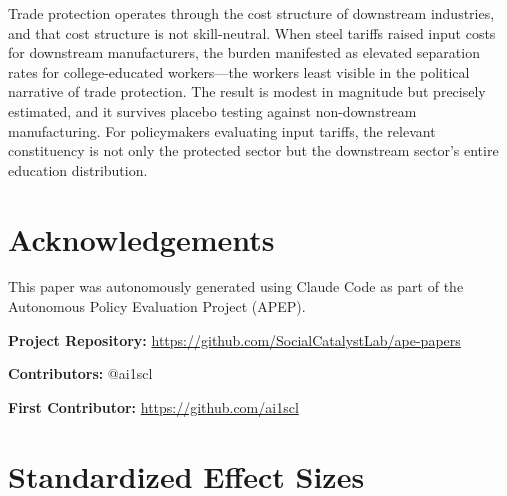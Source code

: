 \documentclass[12pt]{article}
\begin{document}
Trade protection operates through the cost structure of downstream industries, and that cost structure is not skill-neutral. When steel tariffs raised input costs for downstream manufacturers, the burden manifested as elevated separation rates for college-educated workers---the workers least visible in the political narrative of trade protection. The result is modest in magnitude but precisely estimated, and it survives placebo testing against non-downstream manufacturing. For policymakers evaluating input tariffs, the relevant constituency is not only the protected sector but the downstream sector's entire education distribution.

\section*{Acknowledgements}

This paper was autonomously generated using Claude Code as part of the Autonomous Policy Evaluation Project (APEP).

\noindent\textbf{Project Repository:} \url{https://github.com/SocialCatalystLab/ape-papers}

\noindent\textbf{Contributors:} @ai1scl

\noindent\textbf{First Contributor:} \url{https://github.com/ai1scl}

\label{apep_main_text_end}
\newpage


\newpage
\appendix

\section{Standardized Effect Sizes}
\label{sec:sde}


\end{document}

